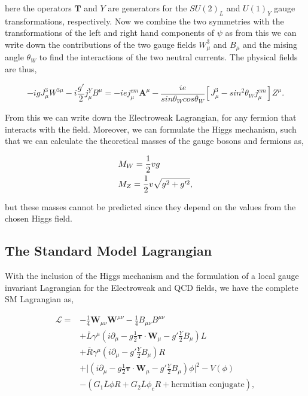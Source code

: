 here the operators $\boldsymbol{T}$ and $Y$ are generators for the $SU(2)_L$ and $U(1)_Y$ gauge transformations, respectively. Now we combine the two symmetries with the transformations of the left and right hand components of $\psi$ as from this we can write down the contributions of the two gauge fields $W_\mu^3$ and $B_\mu$ and the mising angle $\theta_W$ to find the interactions of the two neutral currents. The physical fields are thus,

\begin{equation}
-igJ_\mu^3W^{3\mu}-i\frac{g'}{2}j_\mu^YB^\mu=-iej_\mu^{em}\boldsymbol{A}^\mu-\frac{ie}{sin\theta_Wcos\theta_W}[J_\mu^3-sin^2\theta_Wj_\mu^{em}]Z^\mu.
\end{equation}

From this we can write down the Electroweak Lagrangian, for any fermion that interacts with the field. Moreover, we can formulate the Higgs mechanism, such that we can calculate the theoretical masses of the gauge bosons and fermions as, 

\begin{equation}
\begin{split}
& M_{W}=\frac{1}{2}vg \\
& M_{Z}=\frac{1}{2}v\sqrt{g^2+g'^2},
\end{split}
\end{equation}

but these masses cannot be predicted since they depend on the values from the chosen Higgs field. 

\subsection{The Standard Model Lagrangian}

With the inclusion of the Higgs mechanism and the formulation of a local gauge invariant Lagrangian for the Electroweak and QCD fields, we have the complete SM Lagrangian as,

\begin{equation}\label{SMLagrangian}
\begin{split}
\mathcal{L}=&-\frac{1}{4}\boldsymbol{W}_{\mu\nu}\boldsymbol{W}^{\mu\nu}-\frac{1}{4}B_{\mu\nu}B^{\mu\nu} \\
&+\overline{L}\gamma^\mu(i\partial_\mu-g\frac{1}{2}\boldsymbol{\tau}\cdot\boldsymbol{W}_\mu-g'\frac{Y}{2}B_\mu)L \\
&+\overline{R}\gamma^\mu(i\partial_\mu-g'\frac{Y}{2}B_\mu)R \\
&+\lvert(i\partial_\mu-g\frac{1}{2}\boldsymbol{\tau}\cdot\boldsymbol{W}_\mu-g'\frac{Y}{2}B_\mu)\phi\lvert^2-V(\phi) \\
&-(G_1\overline{L}\phi R+G_2\overline{L}\phi_cR+\text{hermitian conjugate}),
\end{split}
\end{equation}

